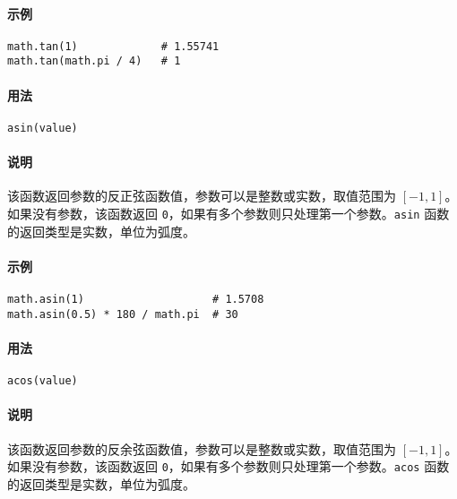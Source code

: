 \paragraph{示例}
\begin{lstlisting}[language=berry, numbers=none]
math.tan(1)             # 1.55741
math.tan(math.pi / 4)   # 1
\end{lstlisting}


\paragraph{用法}
\begin{lstlisting}[language=berry, numbers=none]
asin(value)
\end{lstlisting}

\paragraph{说明}
该函数返回参数的反正弦函数值，参数可以是整数或实数，取值范围为 $[-1,1]$。如果没有参数，该函数返回 \texttt{0}，如果有多个参数则只处理第一个参数。\texttt{asin} 函数的返回类型是实数，单位为弧度。

\paragraph{示例}
\begin{lstlisting}[language=berry, numbers=none]
math.asin(1)                    # 1.5708
math.asin(0.5) * 180 / math.pi  # 30
\end{lstlisting}


\paragraph{用法}
\begin{lstlisting}[language=berry, numbers=none]
acos(value)
\end{lstlisting}

\paragraph{说明}
该函数返回参数的反余弦函数值，参数可以是整数或实数，取值范围为 $[-1,1]$。如果没有参数，该函数返回 \texttt{0}，如果有多个参数则只处理第一个参数。\texttt{acos} 函数的返回类型是实数，单位为弧度。

